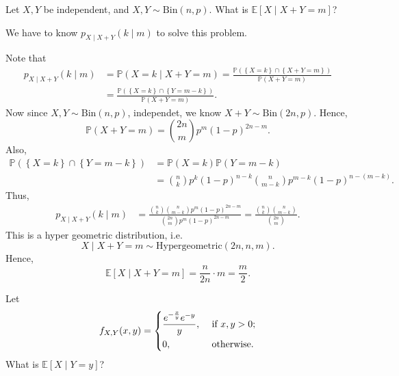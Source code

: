 \begin{eg}
    Let \(X, Y\) be independent, and \(X, Y \sim \mathrm{Bin}(n, p)\). What is \(\mathbb{E} [X \mid X + Y = m]\)?   
\end{eg}
\begin{explanation}
    We have to know \(p_{X \mid X+Y}(k \mid m)\) to solve this problem.

    Note that 
    \begin{align*}
        p_{X \mid X + Y} (k \mid m) &= \mathbb{P} (X = k \mid X + Y = m) = \frac{\mathbb{P} \left( \left\{ X = k \right\} \cap \left\{ X + Y = m \right\}   \right) }{\mathbb{P} (X + Y = m)} \\
        &= \frac{\mathbb{P} \left( \left\{ X = k \right\} \cap \left\{ Y = m - k \right\}   \right) }{\mathbb{P} (X + Y = m)}.
    \end{align*} 
    Now since \(X, Y \sim \mathrm{Bin}(n, p) \), independet, we know \(X + Y \sim \mathrm{Bin}(2n, p) \). Hence, 
    \[
        \mathbb{P} (X + Y = m) = \binom{2n}{m} p^m (1 - p)^{2n - m}.
    \]  
    Also,
    \begin{align*}
        \mathbb{P} \left( \left\{ X = k \right\} \cap \left\{ Y = m - k \right\}   \right) &= \mathbb{P} (X = k) \mathbb{P} (Y = m - k) \\
        &= \binom{n}{k} p^k (1 - p)^{n - k} \binom{n}{m - k} p^{m - k} (1 - p)^{n - (m - k)}.
    \end{align*}
    Thus,
    \begin{align*}
        p_{X \mid X + Y} (k \mid m) &= \frac{\binom{n}{k} \binom{n}{m - k} p^m (1 - p)^{2n - m}}{\binom{2n}{m} p^m (1 - p)^{2n - m}} = \frac{\binom{n}{k} \binom{n}{m - k}}{\binom{2n}{m}}.
    \end{align*}
    This is a hyper geometric distribution, i.e. 
    \[
        X \mid X + Y = m \sim \mathrm{Hypergeometric}(2n, n, m). 
    \]
    Hence,
    \[
        \mathbb{E} [X \mid X + Y = m] = \frac{n}{2n} \cdot m = \frac{m}{2}.
    \]
\end{explanation}

\begin{eg}
    Let 
    \[
        f_{X, Y} (x, y) = \begin{dcases}
            \frac{e^{- \frac{x}{y}} e^{-y}}{y}, &\text{ if } x, y > 0 ;\\
            0, &\text{ otherwise} .
        \end{dcases}
    \]
    What is \(\mathbb{E} [X \mid Y = y]\)? 
\end{eg}

